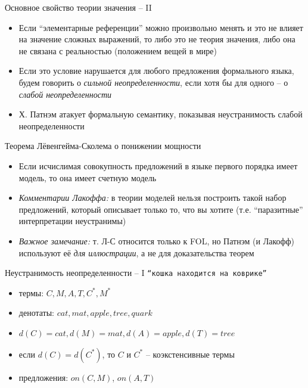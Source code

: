\documentclass{beamer}
\begin{document}
\begin{frame}{Основное свойство теории значения -- II}
\begin{itemize}	
    \item Если ``элементарные референции'' можно произвольно менять и это не влияет на значение сложных выражений, то либо это не теория значения, либо она не связана с реальностью (положением вещей в мире)
	\item Если это условие нарушается для любого предложения формального языка, будем говорить о \textit{сильной неопределенности}, если хотя бы для одного -- о \textit{слабой неопределенности}
	\item Х. Патнэм атакует формальную семантику, показывая неустранимость слабой неопределенности
\end{itemize}
\end{frame}

\begin{frame}{Теорема Лёвенгейма-Сколема о понижении мощности}
\begin{itemize}
	\item[] Если исчислимая совокупность предложений в языке первого порядка имеет модель, то она имеет счетную модель
	\bigskip
	\item \textit{Комментарии Лакоффа:} в теории моделей нельзя построить такой набор предложений, который описывает только то, что вы хотите (т.е. ``паразитные'' интерпретации неустранимы)
	\item \textit{Важное замечание:} т. Л-С относится только к FOL, но Патнэм (и Лакофф) используют её \textit{для иллюстрации}, а не для доказательства теорем
\end{itemize}
\end{frame}

\begin{frame}{Неустранимость неопределенности -- I}
\texttt{``кошка находится на коврике''}
\bigskip
\begin{itemize}
        \item термы: $C, M, A, T, C^*, M^*$
        \smallskip
        \item денотаты: $cat, mat, apple, tree, quark$
        \smallskip
        \item $d(C) = cat, d(M) = mat, d(A) = apple, d(T) = tree$
        \smallskip
        \item если $d(C) = d(C^*)$, то $C$ и $C^*$ -- коэкстенсивные термы
        \smallskip
        \item предложения: $on(C,M)$, $on(A,T)$
\end{itemize}
\end{frame}
\end{document}
